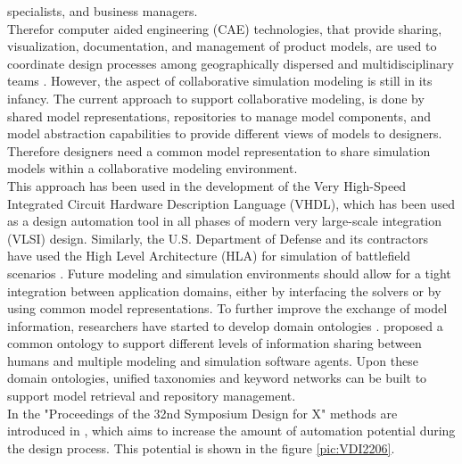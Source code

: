 specialists, and business managers.\cite{sinha_modeling_2001}\\
Therefor computer aided engineering (CAE) technologies, that provide sharing, visualization, 
documentation, and management of product models,
are used to coordinate design processes among geographically dispersed and multidisciplinary
teams \cite{finger_creating_1994, bajaj_web_1999, iwasaki_web-based_2002}.
However, the aspect of collaborative simulation modeling is still in its infancy. 
The current approach to support collaborative modeling, is done by shared model representations, 
repositories to manage model components, and model abstraction capabilities to provide different views of models to designers.
Therefore designers need a common model representation to share simulation models within a collaborative modeling environment.\cite{sinha_modeling_2001}\\
This approach has been used in the development of the Very High-Speed Integrated Circuit Hardware Description Language (VHDL),
which has been used as a design automation tool in all phases of modern very large-scale integration (VLSI) design. 
Similarly, the U.S. Department of Defense and its contractors have used the High Level Architecture (HLA) for simulation of
battlefield scenarios \cite{lutz_high_1998,park_relational_1994}.
Future modeling and simulation environments should allow for a tight integration
between application domains, either by interfacing the solvers or by using common model representations.
To further improve the exchange of model information, researchers have started to develop domain ontologies \cite{devedzic_survey_1999}. 
\cite{ozawa_model_2000} proposed a common ontology to support different levels of information sharing between humans and multiple
modeling and simulation software agents. 
Upon these domain ontologies, unified taxonomies and keyword networks
can be built to support model retrieval and repository management.\\
In the "Proceedings of the 32nd Symposium Design for X" methods are introduced in \cite{Herrmann2021, Berschik2021, Altun2021, Russwurm2021}, 
which aims to increase the amount of automation potential during the design process.
This potential is shown in the figure \ref{pic:VDI2206}.
